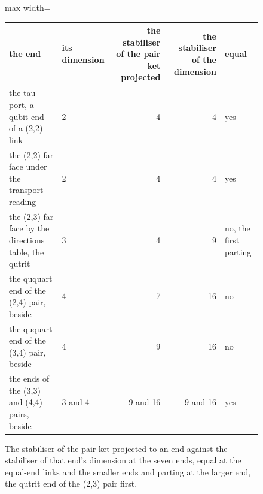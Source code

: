 \begin{figure}[h]\centering
\begin{adjustbox}{max width=\linewidth}\begin{tabular}{llrrl}\toprule
the end & its dimension & the stabiliser of the pair ket projected & the stabiliser of the dimension & equal \\ \midrule
the tau port, a qubit end of a (2,2) link & 2 & 4 & 4 & yes \\
the (2,2) far face under the transport reading & 2 & 4 & 4 & yes \\
the (2,3) far face by the directions table, the qutrit & 3 & 4 & 9 & no, the first parting \\
the ququart end of the (2,4) pair, beside & 4 & 7 & 16 & no \\
the ququart end of the (3,4) pair, beside & 4 & 9 & 16 & no \\
the ends of the (3,3) and (4,4) pairs, beside & 3 and 4 & 9 and 16 & 9 and 16 & yes \\ \bottomrule
\end{tabular}\end{adjustbox}
\caption{The stabiliser of the pair ket projected to an end against the stabiliser of that end's dimension at the seven ends, equal at the equal-end links and the smaller ends and parting at the larger end, the qutrit end of the (2,3) pair first.}
\end{figure}
